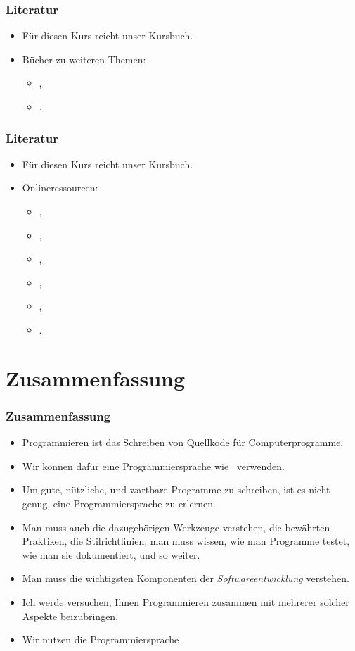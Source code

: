 \documentclass[aspectratio=169,mathserif,notheorems]{beamer}%
\begin{document}
%
\begin{frame}[t]\frametitle{Literatur}%
\begin{itemize}%
\item Für diesen Kurs reicht unser Kursbuch\cite{programmingWithPython}.%
\item Bücher zu weiteren Themen:\begin{itemize}%
\item {},%
\item {}.%
\end{itemize}%
\end{itemize}%
\end{frame}%
%
\begin{frame}[t]\frametitle{Literatur}%
\begin{itemize}%
\item Für diesen Kurs reicht unser Kursbuch\cite{programmingWithPython}.%
\item Onlineressourcen:\begin{itemize}%
\item {},
\item {},%
\item {},%
\item {},%
\item {},%
\item {}.%
\end{itemize}%
\end{itemize}%
\end{frame}%
%
\section{Zusammenfassung}%
%
\begin{frame}\frametitle{Zusammenfassung}%
%
\begin{itemize}%
\item Programmieren ist das Schreiben von Quellkode für Computerprogramme.%
\item<2-> Wir können dafür eine Programmiersprache wie \python\ verwenden.%
\item<3-> Um gute, nützliche, und wartbare Programme zu schreiben, ist es nicht genug, eine Programmiersprache zu erlernen.%
\item<4-> Man muss auch die dazugehörigen Werkzeuge verstehen, die bewährten Praktiken, die Stilrichtlinien, man muss wissen, wie man Programme testet, wie man sie dokumentiert, und so weiter.%
\item<5-> Man muss die wichtigsten Komponenten der \emph{Softwareentwicklung} verstehen.
\item<6-> Ich werde versuchen, Ihnen Programmieren zusammen mit mehrerer solcher Aspekte beizubringen.%
\item<7-> Wir nutzen die Programmiersprache \python{}%
\end{itemize}%
\end{frame}%
%
\endPresentation%
\end{document}
